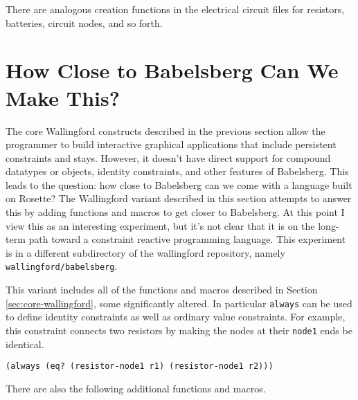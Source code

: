 \documentclass{article}
\begin{document}
There are analogous creation functions in the electrical circuit files
for resistors, batteries, circuit nodes, and so forth.

\section{How Close to Babelsberg Can We Make This?}
\label{sec:closer-to-babelsberg}

The core Wallingford constructs described in the previous section
allow the programmer to build interactive graphical applications that
include persistent constraints and stays.  However, it doesn't have
direct support for compound datatypes or objects, identity
constraints, and other features of Babelsberg.  This leads to the
question: how close to Babelsberg can we come with a language built on
Rosette?  The Wallingford variant described in this section attempts
to answer this by adding functions and macros to get closer to
Babelsberg.  At this point I view this as an interesting experiment,
but it's not clear that it is on the long-term path toward a
constraint reactive programming language.  This experiment is in a
different subdirectory of the wallingford repository, namely
\verb|wallingford/babelsberg|.

This variant includes all of the functions and macros described in
Section \ref{sec:core-wallingford}, some significantly altered.  In
particular \verb|always| can be used to define identity constraints as
well as ordinary value constraints.  For example, this constraint
connects two resistors by making the nodes at their \verb|node1| ends
be identical.

\begin{verbatim}
(always (eq? (resistor-node1 r1) (resistor-node1 r2)))
\end{verbatim}

There are also the following additional functions and macros.
\end{document}
